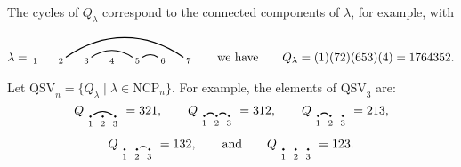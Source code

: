 \documentclass[submission]{FPSAC2024}
\theoremstyle{definition}
\theoremstyle{remark}
\numberwithin{equation}{section}
\newcommand{\QSV}{\mathrm{QSV}}
\newcommand{\NCP}{\mathrm{NCP}}
\begin{document}
The cycles of $Q_{\lambda}$ correspond to the connected components of $\lambda$, for example, with
\[
\lambda = \begin{tikzpicture}[scale = 0.75, baseline = 0.75*-0.2]
\foreach \x in {1, ..., 7}{\draw[fill] (\x - 1, 0) node[inner sep = 2pt] (\x) {$\scriptstyle \x$};}
\foreach \i\j in {5/6, 3/5,2/7}{\draw[thick] (\i) to[out = 35, in = 145] (\j);}
\end{tikzpicture}
\qquad\text{we have}\qquad
Q_{\lambda} = (1)(72)(653)(4) = 1764352.
\]

Let
$
\QSV_{n} = \{Q_{\lambda} \;|\; \lambda \in \NCP_{n} \}.
$
For example, the elements of $\QSV_{3}$ are:
\[
Q_{\begin{tikzpicture}[scale = 0.35, baseline = 0.35*-0.2]
\foreach \x in {1, ..., 3}{\draw[fill] (\x - 1, 0) circle (2pt) node[inner sep = 2pt] (\x) {};}
\foreach \x in {1, ..., 3}{\node[below] at (\x) {$\scriptstyle \x$};}
\foreach \i\j in {1/3}{\draw[thick] (\i) to[out = 35, in = 145] (\j);}
\end{tikzpicture}} = 321, \qquad
Q_{\begin{tikzpicture}[scale = 0.35, baseline = 0.35*-0.2]
\foreach \x in {1, ..., 3}{\draw[fill] (\x - 1, 0) circle (2pt) node[inner sep = 2pt] (\x) {};}
\foreach \x in {1, ..., 3}{\node[below] at (\x) {$\scriptstyle \x$};}
\foreach \i\j in {1/2, 2/3}{\draw[thick] (\i) to[out = 35, in = 145] (\j);}
\end{tikzpicture}} = 312, \qquad
Q_{\begin{tikzpicture}[scale = 0.35, baseline = 0.35*-0.2]
\foreach \x in {1, ..., 3}{\draw[fill] (\x - 1, 0) circle (2pt) node[inner sep = 2pt] (\x) {};}
\foreach \x in {1, ..., 3}{\node[below] at (\x) {$\scriptstyle \x$};}
\foreach \i\j in {1/2}{\draw[thick] (\i) to[out = 35, in = 145] (\j);}
\end{tikzpicture}} = 213, 
\]
\[
Q_{\begin{tikzpicture}[scale = 0.35, baseline = 0.35*-0.2]
\foreach \x in {1, ..., 3}{\draw[fill] (\x - 1, 0) circle (2pt) node[inner sep = 2pt] (\x) {};}
\foreach \x in {1, ..., 3}{\node[below] at (\x) {$\scriptstyle \x$};}
\foreach \i\j in {2/3}{\draw[thick] (\i) to[out = 35, in = 145] (\j);}
\end{tikzpicture}} = 132, \qquad\text{and}\qquad
Q_{\begin{tikzpicture}[scale = 0.35, baseline = 0.35*-0.2]
\foreach \x in {1, ..., 3}{\draw[fill] (\x - 1, 0) circle (2pt) node[inner sep = 2pt] (\x) {};}
\foreach \x in {1, ..., 3}{\node[below] at (\x) {$\scriptstyle \x$};}
\end{tikzpicture}} = 123.
\]
\end{document}
